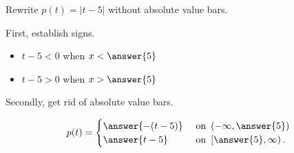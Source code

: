 \documentclass{ximera}
\author{Lee Wayand}
\begin{document}
\begin{example}











Rewrite $p(t) = | t - 5 |$ without absolute value bars.



\begin{explanation}


First, establish signs.

\begin{itemize}
\item $t - 5 < 0$ when $x < \answer{5}$
\item $t - 5 > 0$ when $x > \answer{5}$
\end{itemize}


Secondly, get rid of absolute value bars.

\[
p(t) = 
\begin{cases}
  \answer{-(t - 5)} & \text{ on } \left( -\infty, \answer{5} \right)   \\
  \answer{t - 5}  & \text{ on } \left[ \answer{5}, \infty \right).
\end{cases}
\]






\end{explanation}






\end{example}
\end{document}
